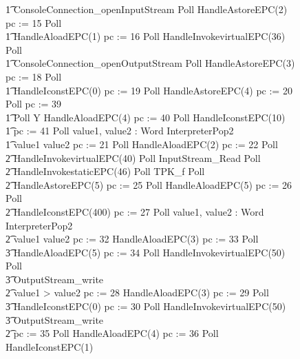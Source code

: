 \begin{figure}[p!]
\begin{circus}
    \t1 ConsoleConnection\_openInputStream \circseq Poll \circseq  HandleAstoreEPC(2) \circseq pc := 15 \circseq Poll \circseq \\
    \t1 HandleAloadEPC(1) \circseq pc := 16 \circseq Poll \circseq HandleInvokevirtualEPC(36) \circseq Poll \circseq \\
    \t1 ConsoleConnection\_openOutputStream \circseq Poll \circseq HandleAstoreEPC(3) \circseq pc := 18 \circseq Poll \circseq \\
    \t1 HandleIconstEPC(0) \circseq pc := 19 \circseq Poll \circseq HandleAstoreEPC(4) \circseq pc := 20 \circseq Poll \circseq pc := 39 \circseq \\
    \t1 Poll \circseq\circmu Y \circspot HandleAloadEPC(4) \circseq pc := 40 \circseq Poll \circseq HandleIconstEPC(10) \circseq \\
    \t1 pc := 41 \circseq Poll \circseq \circvar value1, value2 : Word \circspot InterpreterPop2 \circseq \\
    \t1 \circif value1 \leq value2 \circthen pc := 21 \circseq Poll \circseq HandleAloadEPC(2) \circseq pc := 22 \circseq Poll \circseq \\
    \t2 HandleInvokevirtualEPC(40) \circseq Poll \circseq InputStream\_Read \circseq Poll \circseq \\
    \t2 HandleInvokestaticEPC(46) \circseq Poll \circseq TPK\_f  \circseq Poll \circseq \\
    \t2 HandleAstoreEPC(5) \circseq pc := 25 \circseq Poll \circseq HandleAloadEPC(5) \circseq pc := 26 \circseq Poll \circseq \\
    \t2 HandleIconstEPC(400) \circseq pc := 27 \circseq Poll \circseq \circvar value1, value2 : Word \circspot InterpreterPop2 \circseq \\
    \t2 \circif value1 \leq value2 \circthen pc := 32 \circseq HandleAloadEPC(3) \circseq pc := 33 \circseq Poll \circseq \\
    \t3 HandleAloadEPC(5) \circseq pc := 34 \circseq Poll \circseq HandleInvokevirtualEPC(50) \circseq Poll \circseq \\
    \t3 OutputStream\_write \\
    \t2 {} \circelse value1 > value2 \circthen pc := 28 \circseq HandleAloadEPC(3) \circseq pc := 29 \circseq Poll \circseq \\
    \t3 HandleIconstEPC(0) \circseq pc := 30 \circseq Poll \circseq HandleInvokevirtualEPC(50) \circseq \\
    \t3 OutputStream\_write \\
    \t2 \circfi \circseq pc := 35 \circseq Poll \circseq HandleAloadEPC(4) \circseq pc := 36 \circseq Poll \circseq HandleIconstEPC(1) \circseq \\

\end{circus}
\end{figure}
